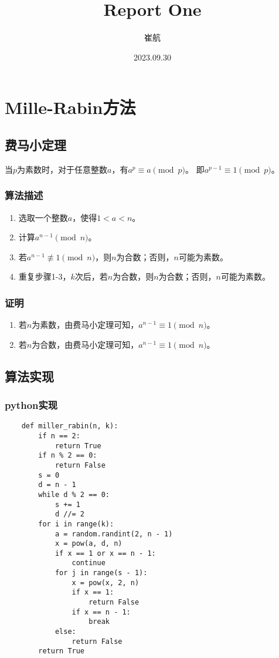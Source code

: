 \documentclass[a4paper]{article}
\title{\heiti\zihao{3} Report One}
\author{\songti 崔航}
\date{2023.09.30}
\begin{document}
    \maketitle
\begin{abstract}
    \lipsum[2]
\end{abstract}
\tableofcontents
\section{Mille-Rabin方法}
\subsection{费马小定理}
当$p$为素数时，对于任意整数$a$，有$a^p\equiv a\pmod p$。
即$a^{p-1}\equiv 1\pmod p$。
\subsubsection{算法描述}
\begin{enumerate}
    \item 选取一个整数$a$，使得$1<a<n$。
    \item 计算$a^{n-1}\pmod n$。
    \item 若$a^{n-1}\not\equiv 1\pmod n$，则$n$为合数；否则，$n$可能为素数。
    \item 重复步骤1-3，$k$次后，若$n$为合数，则$n$为合数；否则，$n$可能为素数。
\end{enumerate}
\subsubsection{证明}
\begin{enumerate}
    \item 若$n$为素数，由费马小定理可知，$a^{n-1}\equiv 1\pmod n$。
    \item 若$n$为合数，由费马小定理可知，$a^{n-1}\equiv 1\pmod n$。

\end{enumerate}
\subsection{算法实现}
\subsubsection{python实现}
\begin{verbatim}
    def miller_rabin(n, k):
        if n == 2:
            return True
        if n % 2 == 0:
            return False
        s = 0
        d = n - 1
        while d % 2 == 0:
            s += 1
            d //= 2
        for i in range(k):
            a = random.randint(2, n - 1)
            x = pow(a, d, n)
            if x == 1 or x == n - 1:
                continue
            for j in range(s - 1):
                x = pow(x, 2, n)
                if x == 1:
                    return False
                if x == n - 1:
                    break
            else:
                return False
        return True
\end{verbatim}
\section{}
\end{document}
